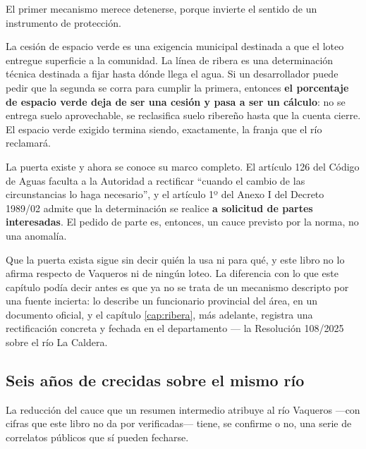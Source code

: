 \begin{cautela}
El primer mecanismo merece detenerse, porque invierte el sentido de un instrumento de protección.

La cesión de espacio verde es una exigencia municipal destinada a que el loteo entregue superficie a la comunidad. La línea de ribera es una determinación técnica destinada a fijar hasta dónde llega el agua. Si un desarrollador puede pedir que la segunda se corra para cumplir la primera, entonces \textbf{el porcentaje de espacio verde deja de ser una cesión y pasa a ser un cálculo}: no se entrega suelo aprovechable, se reclasifica suelo ribereño hasta que la cuenta cierre. El espacio verde exigido termina siendo, exactamente, la franja que el río reclamará.

La puerta existe y ahora se conoce su marco completo. El artículo 126 del Código de Aguas faculta a la Autoridad a rectificar ``cuando el cambio de las circunstancias lo haga necesario'', y el artículo 1º del Anexo I del Decreto 1989/02 admite que la determinación se realice \textbf{a solicitud de partes interesadas}. El pedido de parte es, entonces, un cauce previsto por la norma, no una anomalía.

Que la puerta exista sigue sin decir quién la usa ni para qué, y este libro no lo afirma respecto de Vaqueros ni de ningún loteo. La diferencia con lo que este capítulo podía decir antes es que ya no se trata de un mecanismo descripto por una fuente incierta: lo describe un funcionario provincial del área, en un documento oficial, y el capítulo \ref{cap:ribera}, más adelante, registra una rectificación concreta y fechada en el departamento --- la Resolución 108/2025 sobre el río La Caldera.
\end{cautela}

\subsection*{Seis años de crecidas sobre el mismo río}

La reducción del cauce que un resumen intermedio atribuye al río Vaqueros ---con cifras que este libro no da por verificadas--- tiene, se confirme o no, una serie de correlatos públicos que sí pueden fecharse.

